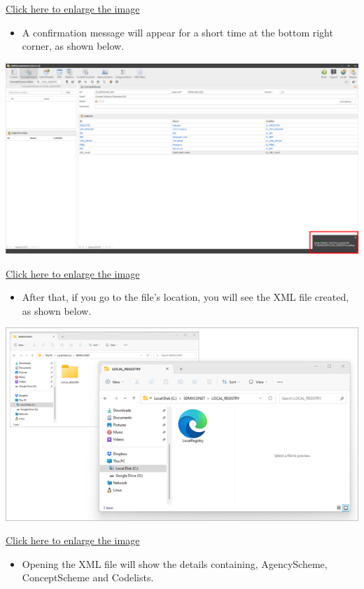 \documentclass[
]{book}
\providecommand{\tightlist}{%
  \setlength{\itemsep}{0pt}\setlength{\parskip}{0pt}}
\theoremstyle{definition}
\theoremstyle{definition}
\theoremstyle{definition}
\theoremstyle{definition}
\theoremstyle{remark}
\begin{document}
\href{images/image125.png}{Click here to enlarge the image}

\begin{itemize}
\tightlist
\item
  A confirmation message will appear for a short time at the bottom right corner, as shown below.
\end{itemize}

\begin{center}\includegraphics[width=1\linewidth]{./images/image127} \end{center}

\href{images/image127.png}{Click here to enlarge the image}

\begin{itemize}
\tightlist
\item
  After that, if you go to the file's location, you will see the XML file created, as shown below.
\end{itemize}

\begin{center}\includegraphics[width=0.5\linewidth]{./images/image129} \end{center}

\href{images/image129.png}{Click here to enlarge the image}

\begin{itemize}
\tightlist
\item
  Opening the XML file will show the details containing, AgencyScheme, ConceptScheme and Codelists.
\end{itemize}
\end{document}
